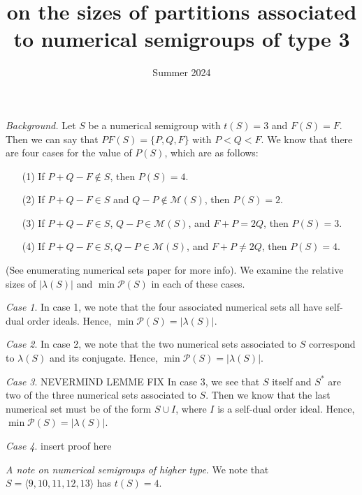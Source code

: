 \documentclass{article}
\title{on the sizes of partitions associated to numerical semigroups of type 3}
\date{Summer 2024}
\theoremstyle{definition}
\theoremstyle{definition}
\theoremstyle{definition}
\begin{document}
\maketitle

\textit{Background.} Let $S$ be a numerical semigroup with $t(S) = 3$ and $F(S) = F$. Then we can say that $PF(S) = \{P, Q, F\}$ with $P < Q < F$. We know that there are four cases for the value of $P(S)$, which are as follows:

\begin{enumerate}
    \item[(1)] If $P+Q-F \notin S$, then $P(S) = 4$.
    \item[(2)] If $P+Q-F \in S$ and $Q-P \notin \mathcal{M}(S)$, then $P(S) = 2$.
    \item[(3)] If $P+Q-F \in S$, $Q-P \in \mathcal{M}(S)$, and $F+P = 2Q$, then $P(S) = 3$.
    \item[(4)] If $P+Q-F \in S, Q-P \in \mathcal{M}(S)$, and $F+P \neq 2Q$, then $P(S) = 4$.
\end{enumerate}

(See enumerating numerical sets paper for more info). We examine the relative sizes of $|\lambda(S)|$ and $\min \mathcal{P}(S)$ in each of these cases.

\textit{Case 1}. In case 1, we note that the four associated numerical sets all have self-dual order ideals. Hence, $\min \mathcal{P}(S) = |\lambda (S)|$.

\textit{Case 2}. In case 2, we note that the two numerical sets associated to $S$ correspond to $\lambda(S)$ and its conjugate. Hence, $\min \mathcal{P}(S) = |\lambda (S)|$.

\textit{Case 3}. NEVERMIND LEMME FIX In case 3, we see that $S$ itself and $S^*$ are two of the three numerical sets associated to $S$. Then we know that the last numerical set must be of the form $S \cup I$, where $I$ is a self-dual order ideal. Hence, $\min \mathcal{P}(S) = |\lambda (S)|$.

\textit{Case 4}. insert proof here


\textit{A note on numerical semigroups of higher type}. We note that $S= \langle 9, 10, 11, 12, 13 \rangle$ has $t(S) = 4$. 
\end{document}
